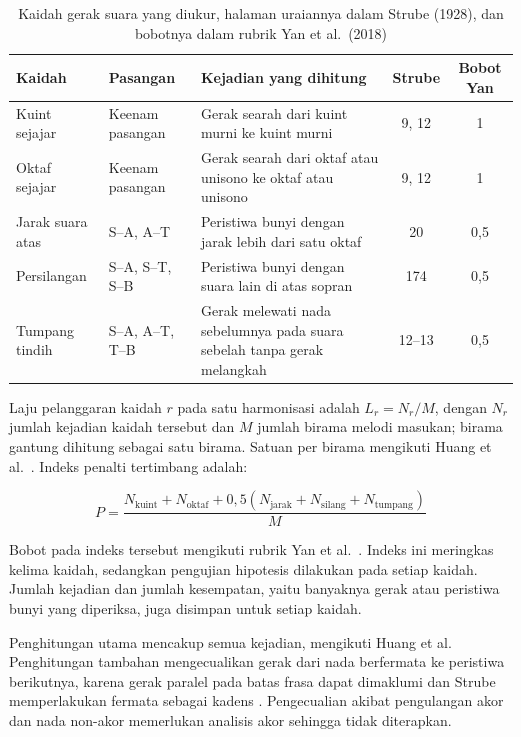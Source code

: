 \begin{table}[ht]
\centering
\small
\begin{tabularx}{\textwidth}{|l|l|>{\raggedright\arraybackslash}X|c|c|}
\hline
\textbf{Kaidah} & \textbf{Pasangan} & \textbf{Kejadian yang dihitung} & \textbf{Strube} & \textbf{Bobot Yan} \\ \hline
Kuint sejajar & Keenam pasangan & Gerak searah dari kuint murni ke kuint murni & 9, 12 & 1 \\ \hline
Oktaf sejajar & Keenam pasangan & Gerak searah dari oktaf atau unisono ke oktaf atau unisono & 9, 12 & 1 \\ \hline
Jarak suara atas & S--A, A--T & Peristiwa bunyi dengan jarak lebih dari satu oktaf & 20 & 0,5 \\ \hline
Persilangan & S--A, S--T, S--B & Peristiwa bunyi dengan suara lain di atas sopran & 174 & 0,5 \\ \hline
Tumpang tindih & S--A, A--T, T--B & Gerak melewati nada sebelumnya pada suara sebelah tanpa gerak melangkah & 12--13 & 0,5 \\ \hline
\end{tabularx}
\caption{Kaidah gerak suara yang diukur, halaman uraiannya dalam Strube (1928), dan bobotnya dalam rubrik Yan et al.\ (2018)}
\label{tab:kaidah}
\end{table}

Laju pelanggaran kaidah $r$ pada satu harmonisasi adalah $L_r = N_r / M$, dengan $N_r$ jumlah kejadian kaidah tersebut dan $M$ jumlah birama melodi masukan; birama gantung dihitung sebagai satu birama. Satuan per birama mengikuti Huang et al.\ \parencite{huang2019}. Indeks penalti tertimbang adalah:

{\small
\begin{equation}
P = \frac{N_{\text{kuint}} + N_{\text{oktaf}} + 0{,}5 \left(N_{\text{jarak}} + N_{\text{silang}} + N_{\text{tumpang}}\right)}{M}
\end{equation}
}

Bobot pada indeks tersebut mengikuti rubrik Yan et al.\ \parencite{yan2018}. Indeks ini meringkas kelima kaidah, sedangkan pengujian hipotesis dilakukan pada setiap kaidah. Jumlah kejadian dan jumlah kesempatan, yaitu banyaknya gerak atau peristiwa bunyi yang diperiksa, juga disimpan untuk setiap kaidah.

Penghitungan utama mencakup semua kejadian, mengikuti Huang et al. Penghitungan tambahan mengecualikan gerak dari nada berfermata ke peristiwa berikutnya, karena gerak paralel pada batas frasa dapat dimaklumi \parencite{huang2019} dan Strube memperlakukan fermata sebagai kadens \parencite[174]{strube1928}. Pengecualian akibat pengulangan akor dan nada non-akor \parencite[35]{strube1928} memerlukan analisis akor sehingga tidak diterapkan.

